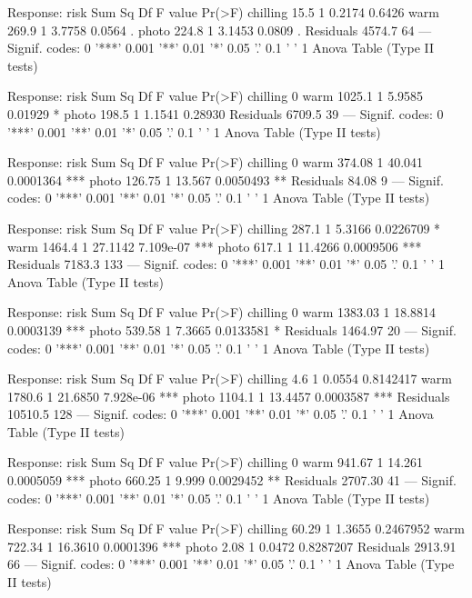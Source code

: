 \documentclass{article}\usepackage[]{graphicx}\usepackage[]{color}
\begin{document}
Response: risk
          Sum Sq Df F value Pr(>F)  
chilling    15.5  1  0.2174 0.6426  
warm       269.9  1  3.7758 0.0564 .
photo      224.8  1  3.1453 0.0809 .
Residuals 4574.7 64                 
---
Signif. codes:  0 '***' 0.001 '**' 0.01 '*' 0.05 '.' 0.1 ' ' 1
Anova Table (Type II tests)

Response: risk
          Sum Sq Df F value  Pr(>F)  
chilling          0                  
warm      1025.1  1  5.9585 0.01929 *
photo      198.5  1  1.1541 0.28930  
Residuals 6709.5 39                  
---
Signif. codes:  0 '***' 0.001 '**' 0.01 '*' 0.05 '.' 0.1 ' ' 1
Anova Table (Type II tests)

Response: risk
          Sum Sq Df F value    Pr(>F)    
chilling          0                      
warm      374.08  1  40.041 0.0001364 ***
photo     126.75  1  13.567 0.0050493 ** 
Residuals  84.08  9                      
---
Signif. codes:  0 '***' 0.001 '**' 0.01 '*' 0.05 '.' 0.1 ' ' 1
Anova Table (Type II tests)

Response: risk
          Sum Sq  Df F value    Pr(>F)    
chilling   287.1   1  5.3166 0.0226709 *  
warm      1464.4   1 27.1142 7.109e-07 ***
photo      617.1   1 11.4266 0.0009506 ***
Residuals 7183.3 133                      
---
Signif. codes:  0 '***' 0.001 '**' 0.01 '*' 0.05 '.' 0.1 ' ' 1
Anova Table (Type II tests)

Response: risk
           Sum Sq Df F value    Pr(>F)    
chilling           0                      
warm      1383.03  1 18.8814 0.0003139 ***
photo      539.58  1  7.3665 0.0133581 *  
Residuals 1464.97 20                      
---
Signif. codes:  0 '***' 0.001 '**' 0.01 '*' 0.05 '.' 0.1 ' ' 1
Anova Table (Type II tests)

Response: risk
           Sum Sq  Df F value    Pr(>F)    
chilling      4.6   1  0.0554 0.8142417    
warm       1780.6   1 21.6850 7.928e-06 ***
photo      1104.1   1 13.4457 0.0003587 ***
Residuals 10510.5 128                      
---
Signif. codes:  0 '***' 0.001 '**' 0.01 '*' 0.05 '.' 0.1 ' ' 1
Anova Table (Type II tests)

Response: risk
           Sum Sq Df F value    Pr(>F)    
chilling           0                      
warm       941.67  1  14.261 0.0005059 ***
photo      660.25  1   9.999 0.0029452 ** 
Residuals 2707.30 41                      
---
Signif. codes:  0 '***' 0.001 '**' 0.01 '*' 0.05 '.' 0.1 ' ' 1
Anova Table (Type II tests)

Response: risk
           Sum Sq Df F value    Pr(>F)    
chilling    60.29  1  1.3655 0.2467952    
warm       722.34  1 16.3610 0.0001396 ***
photo        2.08  1  0.0472 0.8287207    
Residuals 2913.91 66                      
---
Signif. codes:  0 '***' 0.001 '**' 0.01 '*' 0.05 '.' 0.1 ' ' 1
Anova Table (Type II tests)
\end{document}

